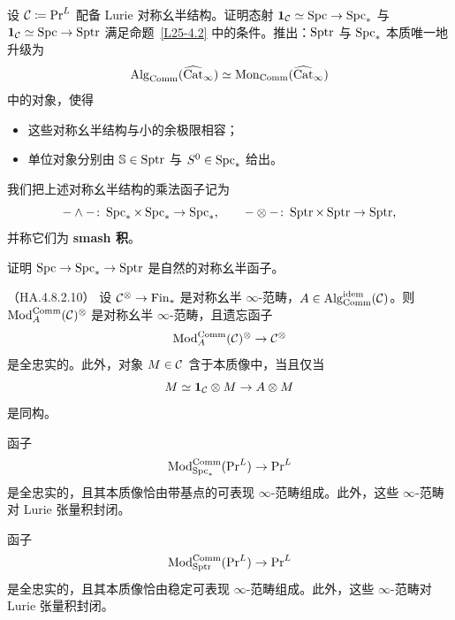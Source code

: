 \begin{exercise}\label{L25-4.3}
设 $\mathcal{C}\coloneqq\mathrm{Pr}^{L}$ 配备 Lurie 对称幺半结构。证明态射 $\mathbf{1}_{\mathcal{C}}\simeq\operatorname{Spc}\to\operatorname{Spc}_{*}$ 与 $\mathbf{1}_{\mathcal{C}}\simeq\operatorname{Spc}\to\operatorname{Sptr}$ 满足命题~\ref{L25-4.2} 中的条件。推出：$\operatorname{Sptr}$ 与 $\operatorname{Spc}_{*}$ 本质唯一地升级为
\[
\operatorname{Alg}_{\mathrm{Comm}}(\widehat{\operatorname{Cat}}_{\infty})\simeq\operatorname{Mon}_{\mathrm{Comm}}(\widehat{\operatorname{Cat}}_{\infty})
\]
中的对象，使得
\begin{itemize}[leftmargin=2.2em,itemsep=0.1em]
\item 这些对称幺半结构与小的余极限相容；
\item 单位对象分别由 $\mathbb{S}\in\operatorname{Sptr}$ 与 $S^{0}\in\operatorname{Spc}_{*}$ 给出。
\end{itemize}
\end{exercise}

\begin{definition}\label{L25-4.4}
我们把上述对称幺半结构的乘法函子记为
\[
-\wedge-\colon\operatorname{Spc}_{*}\times\operatorname{Spc}_{*}\to\operatorname{Spc}_{*},\qquad
-\otimes-\colon\operatorname{Sptr}\times\operatorname{Sptr}\to\operatorname{Sptr},
\]
并称它们为 \textbf{smash 积}。
\end{definition}

\begin{exercise}\label{L25-4.5}
证明 $\operatorname{Spc}\to\operatorname{Spc}_{*}\to\operatorname{Sptr}$ 是自然的对称幺半函子。
\end{exercise}

\begin{proposition}\label{L25-4.6}（HA.4.8.2.10）
设 $\mathcal{C}^{\otimes}\to\mathrm{Fin}_{*}$ 是对称幺半 $\infty$-范畴，$A\in\operatorname{Alg}^{\mathrm{idem}}_{\mathrm{Comm}}(\mathcal{C})$。则 $\operatorname{Mod}^{\mathrm{Comm}}_{A}(\mathcal{C})^{\otimes}$ 是对称幺半 $\infty$-范畴，且遗忘函子
\[
\operatorname{Mod}^{\mathrm{Comm}}_{A}(\mathcal{C})^{\otimes}\to\mathcal{C}^{\otimes}
\]
是全忠实的。此外，对象 $M\in\mathcal{C}$ 含于本质像中，当且仅当
\[
M\simeq\mathbf{1}_{\mathcal{C}}\otimes M\to A\otimes M
\]
是同构。
\end{proposition}

\begin{corollary}\label{L25-4.7}
函子
\[
\operatorname{Mod}^{\mathrm{Comm}}_{\operatorname{Spc}_{*}}(\mathrm{Pr}^{L})\to\mathrm{Pr}^{L}
\]
是全忠实的，且其本质像恰由带基点的可表现 $\infty$-范畴组成。此外，这些 $\infty$-范畴对 Lurie 张量积封闭。
\end{corollary}

\begin{corollary}\label{L25-4.8}
函子
\[
\operatorname{Mod}^{\mathrm{Comm}}_{\operatorname{Sptr}}(\mathrm{Pr}^{L})\to\mathrm{Pr}^{L}
\]
是全忠实的，且其本质像恰由稳定可表现 $\infty$-范畴组成。此外，这些 $\infty$-范畴对 Lurie 张量积封闭。
\end{corollary}

